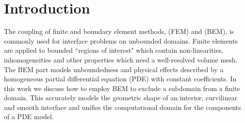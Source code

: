 \documentclass[runningheads]{lncse}
\newcommand{\mydiff}[2]{{}{#2}}
\begin{document}
\section{Introduction}
\label{DRS_FEM_BEM_wSciPAL-sec:drs-fem-bem-intro}

The coupling of finite and boundary element methods, (FEM) and (BEM), is commonly used for 
interface problems on unbounded domains. 
%
\mydiff{The FEM part takes care of}{Finite elements are applied to} bounded ``regions of interest" which contain non-linearities, inhomogeneities and other properties which need a well-resolved volume mesh.
%
The BEM part models unboundedness and 
physical effects
described by a homogeneous partial differential equation (PDE) with \mydiff{constant coefficients, usually assumed to occur far away from the ROI.}{constant coefficients.}
%
In this work we discuss
how to employ BEM to
\mydiff{carve out a finite}{exclude a}
subdomain from a finite domain.
This accurately models the geometric shape of \mydiff{the interface.}{an interior, curvilinear and smooth interface and 
unifies
the computational domain for the 
components of a PDE model.} 
\end{document}
